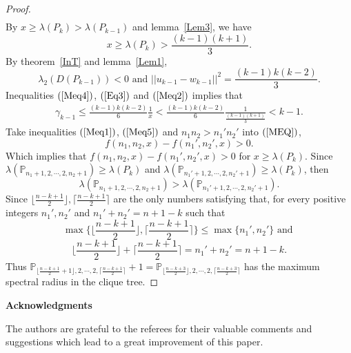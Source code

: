\documentclass[10pt]{article}
\begin{document}
\begin{proof}
\begin{eqnarray}
\end{eqnarray}
By $x\ge \lambda(P_{k})>\lambda(P_{k-1})$ and lemma~\ref{Lem3}, we have
\begin{equation}\label{Eq3}
x\ge  \lambda(P_{k})> \frac{(k-1)(k+1)}{3}.
\end{equation}
By theorem~\ref{InT} and lemma~\ref{Lem1},
\begin{equation}\label{Meq2}\lambda_2(D(P_{k-1}))<0 \mbox{ and }||u_{k-1}-w_{k-1}||^2=\frac{(k-1)k(k-2)}{3}.\end{equation}
Inequalities $(\ref{Meq4})$, $(\ref{Eq3})$ and $(\ref{Meq2})$ implies that
\begin{eqnarray}\label{Meq5}
\gamma_{k-1}\le\frac{(k-1)k(k-2)}{6}\frac{1}{x }<\frac{(k-1)k(k-2)}{6}\frac{1}{\frac{(k-1)(k+1)}{3} }<k-1.
\end{eqnarray}
Take inequalities $(\ref{Meq1})$, $(\ref{Meq5})$ and $n_1n_2>n_1'n_2'$ into $(\ref{MEQ})$,
$$f(n_1,n_2,x)-f(n_1',n_2',x)>0.$$
Which implies that $f(n_1,n_2,x)-f(n_1',n_2',x)>0$ for $x\ge \lambda(P_{k})$. Since $\lambda(\mathbb{P}_{n_1+1,2,\cdots,2,n_2+1})\ge \lambda(P_{k})$ and $\lambda(\mathbb{P}_{n_1'+1,2,\cdots,2,n_2'+1})\ge \lambda(P_{k})$, then
$$\lambda(\mathbb{P}_{n_1+1,2,\cdots,2,n_2+1})>\lambda(\mathbb{P}_{n_1'+1,2,\cdots,2,n_2'+1}).$$
Since $\lfloor \frac{n-k+1}{2}\rfloor,\lceil \frac{n-k+1}{2}\rceil$ are the only numbers satisfying that, for every positive integers $n_1',n_2'$ and $n_1'+n_2'=n+1-k $ such that
$$\max\{\lfloor \frac{n-k+1}{2}\rfloor,\lceil \frac{n-k+1}{2}\rceil\}\le \max\{n_1',n_2'\}\mbox{ and }$$
$$\lfloor \frac{n-k+1}{2}\rfloor+\lceil \frac{n-k+1}{2}\rceil=n_1'+n_2'=n+1-k. $$
Thus $\mathbb{P}_{\lfloor \frac{n-k+1}{2}+1\rfloor,2,\cdots,2,\lceil \frac{n-k+1}{2}\rceil}+1=\mathbb{P}_{\lfloor \frac{n-k+3}{2}\rfloor,2,\cdots,2,\lceil \frac{n-k+3}{2}\rceil}$ has the maximum spectral radius in the clique tree.
\end{proof}
\begin{center}
{\bf Acknowledgments}
\end{center}
The authors are grateful to the referees for their valuable comments and suggestions which lead to a great improvement of this paper.
\end{document}
